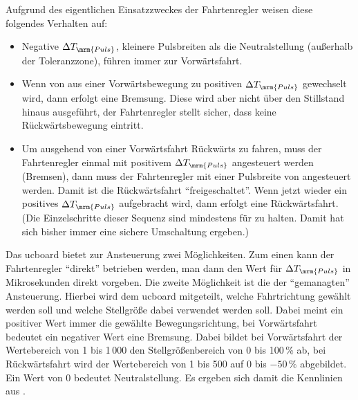 Aufgrund des eigentlichen Einsatzzweckes der Fahrtenregler weisen diese folgendes Verhalten auf:
\begin{itemize}
	\item Negative $\Delta T_\mrm{Puls}$, \dah kleinere Pulsbreiten als die Neutralstellung (außerhalb der Toleranzzone), führen immer zur Vorwärtsfahrt.
	\item Wenn von aus einer Vorwärtsbewegung zu positiven $\Delta T_\mrm{Puls}$ gewechselt wird, dann erfolgt eine Bremsung. Diese wird aber nicht über den Stillstand hinaus ausgeführt, \dah der Fahrtenregler stellt sicher, dass keine Rückwärtsbewegung eintritt.
	\item Um ausgehend von einer Vorwärtsfahrt Rückwärts zu fahren, muss der Fahrtenregler einmal mit positivem $\Delta T_\mrm{Puls}$ angesteuert werden (Bremsen), dann muss der Fahrtenregler mit einer Pulsbreite von  angesteuert werden. Damit ist die Rückwärtsfahrt "`freigeschaltet"'. Wenn jetzt wieder ein positives $\Delta T_\mrm{Puls}$ aufgebracht wird, dann erfolgt eine Rückwärtsfahrt. (Die Einzelschritte dieser Sequenz sind mindestens für  zu halten. Damit hat sich bisher immer eine sichere Umschaltung ergeben.)
\end{itemize}

Das ucboard bietet zur Ansteuerung zwei Möglichkeiten. Zum einen kann der Fahrtenregler "`direkt"' betrieben werden, \dah man dann den Wert für $\Delta T_\mrm{Puls}$ in Mikrosekunden direkt vorgeben. Die zweite Möglichkeit ist die der "`gemanagten"' Ansteuerung. Hierbei wird dem ucboard mitgeteilt, welche Fahrtrichtung gewählt werden soll und welche Stellgröße dabei verwendet werden soll. Dabei meint ein positiver Wert immer die gewählte Bewegungsrichtung, bei Vorwärtsfahrt bedeutet ein negativer Wert eine Bremsung. Dabei bildet bei Vorwärtsfahrt der Wertebereich von 1 bis 1\,000 den Stellgrößenbereich von 0 bis 100\,\% ab, bei Rückwärtsfahrt wird der Wertebereich von 1 bis 500 auf 0 bis $-50\,\%$ abgebildet. Ein Wert von 0 bedeutet Neutralstellung. Es ergeben sich damit die Kennlinien aus .

